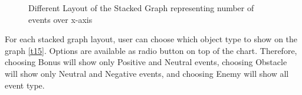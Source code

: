 \begin{figure}[htp] %
\centering
{}\hfil
{}

\hfil
{}

\caption{Different Layout of the Stacked Graph representing number of events over x-axis}
\end{figure}

For each stacked graph layout, user can choose which object type to show on the graph \ref{t15}. Options are available as radio button on top of the chart. Therefore, choosing Bonus will show only Positive and Neutral events, choosing Obstacle will show only Neutral and Negative events, and choosing Enemy will show all event type.

